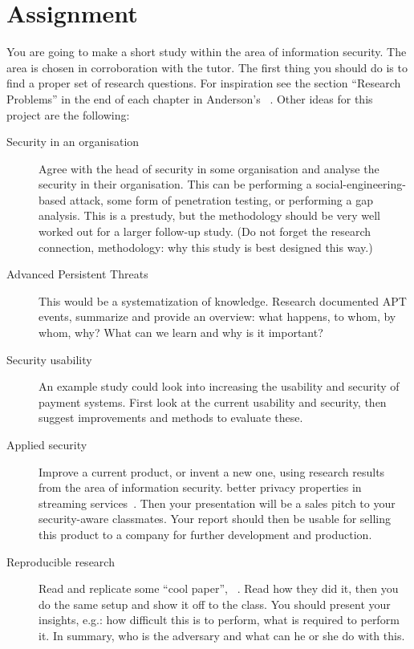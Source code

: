 \documentclass[a4paper]{article}
\begin{document}
\section{Assignment}%
\label{sec:work}

You are going to make a short study within the area of information security.
The area is chosen in corroboration with the tutor.
The first thing you should do is to find a proper set of research questions.
For inspiration see the section \enquote{Research Problems} in the end of each 
chapter in Anderson's ~\cite{Anderson2008sea}.
Other ideas for this project are the following:
\begin{description}
  \item[Security in an organisation]
    Agree with the head of security in some organisation and analyse the 
    security in their organisation.
    This can be \eg performing a social-engineering-based attack, some form of 
    penetration testing, or performing a gap analysis.
    This is a prestudy, but the methodology should be very well worked out for 
    a larger follow-up study.
    (Do not forget the research connection, \eg methodology: why this study is 
    best designed this way.)

  \item[Advanced Persistent Threats]
    This would be a systematization of knowledge.
    Research documented APT events, summarize and provide an overview:
    what happens, to whom, by whom, why?
    What can we learn and why is it important?

  \item[Security usability]
    An example study could look into increasing the usability and security of 
    \eg payment systems.
    First look at the current usability and security, then suggest improvements 
    and methods to evaluate these.

  \item[Applied security]
    Improve a current product, or invent a new one, using research results from 
    the area of information security.
    \Eg better privacy properties in streaming services~\cite{anonpass}.
    Then your presentation will be a sales pitch to your security-aware 
    classmates.
    Your report should then be usable for selling this product to a company for 
    further development and production.

  \item[Reproducible research]
    Read and replicate some \enquote{cool paper}, \eg~\cite{acoustic}.
    Read how they did it, then you do the same setup and show it off to the 
    class.
    You should present your insights, e.g.:
    how difficult this is to perform,
    what is required to perform it.
    In summary, who is the adversary and what can he or she do with this.
\end{description}
\end{document}
